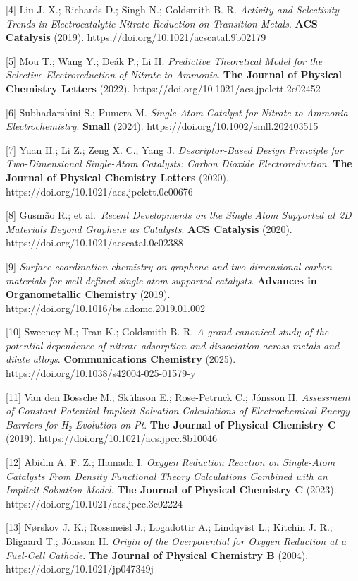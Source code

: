 \documentclass[
]{article}
\begin{document}
{[}4{]} Liu J.-X.; Richards D.; Singh N.; Goldsmith B. R. \emph{Activity
and Selectivity Trends in Electrocatalytic Nitrate Reduction on
Transition Metals}. \textbf{ACS Catalysis} (2019).
https://doi.org/10.1021/acscatal.9b02179

{[}5{]} Mou T.; Wang Y.; Deák P.; Li H. \emph{Predictive Theoretical
Model for the Selective Electroreduction of Nitrate to Ammonia}.
\textbf{The Journal of Physical Chemistry Letters} (2022).
https://doi.org/10.1021/acs.jpclett.2c02452

{[}6{]} Subhadarshini S.; Pumera M. \emph{Single Atom Catalyst for
Nitrate-to-Ammonia Electrochemistry}. \textbf{Small} (2024).
https://doi.org/10.1002/smll.202403515

{[}7{]} Yuan H.; Li Z.; Zeng X. C.; Yang J. \emph{Descriptor-Based
Design Principle for Two-Dimensional Single-Atom Catalysts: Carbon
Dioxide Electroreduction}. \textbf{The Journal of Physical Chemistry
Letters} (2020). https://doi.org/10.1021/acs.jpclett.0c00676

{[}8{]} Gusmão R.; et al.~\emph{Recent Developments on the Single Atom
Supported at 2D Materials Beyond Graphene as Catalysts}. \textbf{ACS
Catalysis} (2020). https://doi.org/10.1021/acscatal.0c02388

{[}9{]} \emph{Surface coordination chemistry on graphene and
two-dimensional carbon materials for well-defined single atom supported
catalysts}. \textbf{Advances in Organometallic Chemistry} (2019).
https://doi.org/10.1016/bs.adomc.2019.01.002

{[}10{]} Sweeney M.; Tran K.; Goldsmith B. R. \emph{A grand canonical
study of the potential dependence of nitrate adsorption and dissociation
across metals and dilute alloys}. \textbf{Communications Chemistry}
(2025). https://doi.org/10.1038/s42004-025-01579-y

{[}11{]} Van den Bossche M.; Skúlason E.; Rose-Petruck C.; Jónsson H.
\emph{Assessment of Constant-Potential Implicit Solvation Calculations
of Electrochemical Energy Barriers for H₂ Evolution on Pt}. \textbf{The
Journal of Physical Chemistry C} (2019).
https://doi.org/10.1021/acs.jpcc.8b10046

{[}12{]} Abidin A. F. Z.; Hamada I. \emph{Oxygen Reduction Reaction on
Single-Atom Catalysts From Density Functional Theory Calculations
Combined with an Implicit Solvation Model}. \textbf{The Journal of
Physical Chemistry C} (2023). https://doi.org/10.1021/acs.jpcc.3c02224

{[}13{]} Nørskov J. K.; Rossmeisl J.; Logadottir A.; Lindqvist L.;
Kitchin J. R.; Bligaard T.; Jónsson H. \emph{Origin of the Overpotential
for Oxygen Reduction at a Fuel-Cell Cathode}. \textbf{The Journal of
Physical Chemistry B} (2004). https://doi.org/10.1021/jp047349j
\end{document}
